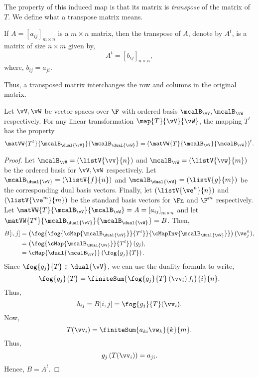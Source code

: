The property of this induced map is that its matrix is \emph{transpose}
of the matrix of $T$. We define what a transpose matrix means.
\begin{Definition}
    If $A = {\left[a_{ij}\right]}_{m \times n}$ is a $m\times n$ matrix, then the transpose of 
    $A$, denote by $A^{t}$, is a matrix of size $n \times m$ given by,
    \[A^{t} = {\left[b_{ij}\right]}_{n \times n},\]
    where, $b_{ij} = a_{ji}$.
\end{Definition}
Thus, a transposed matrix interchanges the row and columns in the original matrix.
\begin{Theorem}
    Let $\vV,\vW$ be vector spaces over $\F$ with ordered basis $\mcalB_{\vV},\mcalB_{\vW}$ respectively.
    For any linear transformation $\map{T}{\vV}{\vW}$, the mapping $T^{t}$ has the property
    \[\matVW{T^{t}}{\mcalB_{\dual{\vV}}}{\mcalB_{\dual{\vW}}} = 
		{\left(\matVW{T}{\mcalB_{\vV}}{\mcalB_{\vW}}\right)}^{t}.\]
\end{Theorem}
\begin{proof}
    Let $\mcalB_{\vV} = \left(\listV{\vv}{n}\right)$ and $\mcalB_{\vW} = \left(\listV{\vw}{m}\right)$ be the
    ordered basis for $\vV,\vW$ respectively.
    Let $\mcalB_{\dual{\vV}} = \left(\listV{f}{n}\right)$ and 
    $\mcalB_{\dual{\vW}} = \left(\listV{g}{m}\right)$ be the corresponding dual basis vectors.
    Finally, let $\left(\listV{\ve^{n}}{n}\right)$ and $\left(\listV{\ve^{m}}{m}\right)$
    be the standard basis vectors for $\Fn$ and $\F^m$ respectively.
    Let $\matVW{T}{\mcalB_{\vV}}{\mcalB_{\vW}} = A = {\left[a_{ij}\right]}_{m \times n}$ and let
    $\matVW{T^{t}}{\mcalB_{\dual{\vV}}}{\mcalB_{\dual{\vW}}} = B$.
    Then,
    \begin{align*}
	B[:,j] &= 
	\left(\fog{\fog{\cMap{\mcalB_{\dual{\vV}}}}{T^{t}}}{\cMapInv{\mcalB_{\dual{\vW}}}}\right)(\ve^{n}_{j}), \\
	&= \left(\fog{\cMap{\mcalB_{\dual{\vV}}}}{T^{t}}\right)(g_j),\\
	&= \cMap{\dual{\mcalB_{\vV}}}\left(\fog{g_j}{T}\right).\\
    \end{align*}
    Since $\fog{g_j}{T} \in \dual{\vV}$, we can use the duality formula to write,
    \[\fog{g_j}{T} = \finiteSum{\fog{g_j}{T}\left(\vv_i\right)f_i}{i}{n}.\]
    Thus,
    \[b_{ij} = B[i,j] = \fog{g_j}{T}(\vv_i).\]
    Now,
    \[T(\vv_i) = \finiteSum{a_{ki}\vw_{k}}{k}{m}.\]
    Thus,
    \[g_j\left(T(\vv_i)\right) = a_{ji}.\]
    Hence, $B = A^{t}$.

\end{proof}
